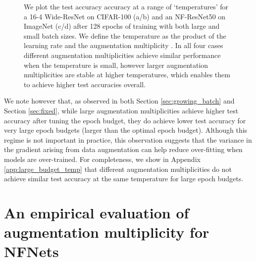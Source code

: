 \documentclass{article}
\begin{document}
\begin{figure}[t]
\centering
\vskip -3mm
 \vskip -2mm
\caption{We plot the test accuracy accuracy at a range of `temperatures' for a 16-4 Wide-ResNet on CIFAR-100 (a/b) and an NF-ResNet50 on ImageNet (c/d) after 128 epochs of training with both large and small batch sizes. We define the temperature as the product of the learning rate  and the augmentation multiplicity . In all four cases different augmentation multiplicities achieve similar performance when the temperature is small, however larger augmentation multiplicities are stable at higher temperatures, which enables them to achieve higher test accuracies overall.
}
 \vskip -3mm
\label{fig:temperature_main}
\end{figure}





We note however that, as observed in both Section \ref{sec:growing_batch} and Section \ref{sec:fixed}, while large augmentation multiplicities achieve higher test accuracy after tuning the epoch budget, they do achieve lower test accuracy for very large epoch budgets (larger than the optimal epoch budget). Although this regime is not important in practice, this observation suggests that the variance in the gradient arising from data augmentation can help reduce over-fitting when models are over-trained. For completeness, we show in Appendix \ref{app:large_budget_temp} that different augmentation multiplicities do not achieve similar test accuracy at the same temperature for large epoch budgets.






\section{An empirical evaluation of augmentation multiplicity for NFNets}
\end{document}
